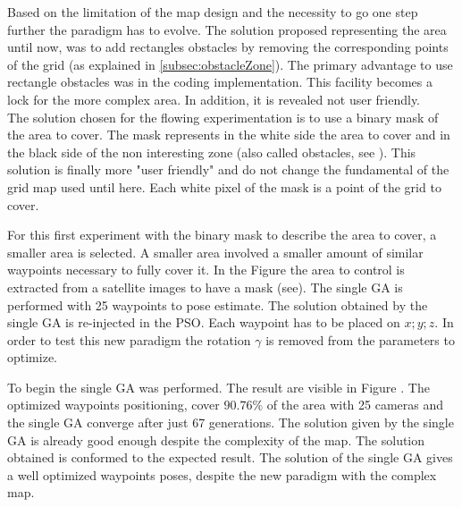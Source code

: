 Based on the limitation of the map design and the necessity to go one step further the paradigm has to evolve.
The solution proposed representing the area until now, was to add rectangles obstacles by removing the corresponding points of the grid (as explained in \ref{subsec:obstacleZone}). The primary advantage to use rectangle obstacles was in the coding implementation. 
This facility becomes a lock for the more complex area. In addition, it is revealed not user friendly.\\
 The solution chosen for the flowing experimentation is to use a binary mask of the area to cover. The mask represents in the white side the area to cover and in  the black side of the non interesting zone (also called obstacles, see ). This solution is finally more "user friendly"  and do not change the fundamental of the grid map used until here. Each white pixel of the mask is a point of the grid to cover.  
 

For this first experiment with the binary mask to describe the area to cover, a smaller area is selected. A smaller area involved a smaller amount of similar waypoints necessary to fully cover it. In the Figure  the area to control is extracted from a satellite images to have a mask (see). The single GA is performed  with 25 waypoints to pose estimate. The solution obtained by the single GA is re-injected in the PSO. Each waypoint has to be placed on $x; y; z$. In order to test this new paradigm the rotation $\gamma$ is removed from the parameters to optimize.

 To begin the single GA was performed. The result are visible in Figure . The optimized waypoints positioning, cover $90.76\%$ of the area with 25 cameras and the single GA converge after just 67 generations. The solution given by the single GA is already good enough despite the complexity of the map. 
  The solution obtained is conformed to the expected result. The solution of the single GA gives a well optimized waypoints poses, despite the new paradigm with the complex map. 
  
